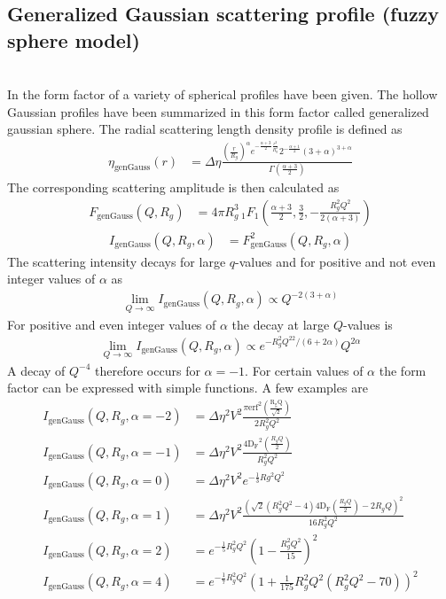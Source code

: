 \subsection{Generalized Gaussian scattering profile (fuzzy sphere model)}
\label{sect:genGaussSphere} ~\\

In \cite{Hofstadter1956} the form factor of a variety of spherical profiles have been given. The hollow Gaussian profiles have been summarized in this form factor called generalized gaussian sphere. The radial scattering length density profile is defined as
\begin{align}
\eta_\mathrm{genGauss}(r)&= \Delta\eta \frac{\left(\frac{r}{R_g}\right)^\alpha
                                             e^{-\frac{\alpha +3}{2} \frac{r^2}{R_g^2}}
                                             2^{-\frac{\alpha+1}{2}}(3+\alpha)^{3+\alpha}
                                            }{\Gamma \left(\frac{\alpha +3}{2}\right)}
\end{align}
The corresponding scattering amplitude is then calculated as
\begin{align}
  F_\mathrm{genGauss}(Q,R_g) &= 4\pi R_g^3 \, _1F_1\left(\frac{\alpha+3}{2},\frac{3}{2},-\frac{R_g^2Q^2}{2(\alpha+3)}\right)
\end{align}
\begin{align}
  I_\mathrm{genGauss}(Q,R_g,\alpha) &= F^2_\mathrm{genGauss}(Q,R_g,\alpha)
\end{align}
The scattering intensity decays for large $q$-values  and for positive and not even integer values of $\alpha$ as
\begin{align}
\lim_{Q\rightarrow\infty} I_\mathrm{genGauss}(Q,R_g,\alpha) \propto Q^{-2(3+\alpha)}
\end{align}
For positive and even integer values of $\alpha$ the decay at large $Q$-values is
\begin{align}
\lim_{Q\rightarrow\infty} I_\mathrm{genGauss}(Q,R_g,\alpha) \propto e^{-R_g^2Q^22/(6+2\alpha)}Q^{2\alpha}
\end{align}
A decay of $Q^{-4}$  therefore occurs for $\alpha=-1$.
For certain values of $\alpha$ the form factor can be expressed with simple functions. A few examples are
\begin{align}
 I_\mathrm{genGauss}(Q,R_g,\alpha=-2) &= \Delta\eta^2V^2\frac{\pi \operatorname{erf^2\left(\frac{R_gQ}{\sqrt{2}}\right)}}{2R_g^2Q^2}\\
 I_\mathrm{genGauss}(Q,R_g,\alpha=-1) &= \Delta\eta^2V^2 \frac{4\operatorname{D_F}^2\left(\frac{R_gQ}{2}\right)}{R_g^2Q^2} \\
 I_\mathrm{genGauss}(Q,R_g,\alpha=0) &= \Delta\eta^2V^2e^{-\frac13Rg^2Q^2} \\
 I_\mathrm{genGauss}(Q,R_g,\alpha=1) &= \Delta\eta^2V^2 \frac{\left(\sqrt{2}(R_g^2Q^2-4)4\operatorname{D_F}\left(\frac{R_gQ}{2}\right)-2R_gQ\right)^2}{16R_g^2Q^2} \\
 I_\mathrm{genGauss}(Q,R_g,\alpha=2) &= e^{-\frac15R_g^2Q^2}\left(1-\frac{R_g^2Q^2}{15}\right)^2\\
 I_\mathrm{genGauss}(Q,R_g,\alpha=4) &= e^{-\frac17R_g^2Q^2}\left(1+\frac{1}{175}R_g^2Q^2(R_g^2Q^2-70)\right)^2
\end{align}
